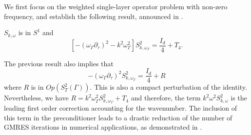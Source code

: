 \documentclass[a4paper]{article}
\begin{document}
We first focus on the weighted single-layer operator problem with non-zero frequency, and establish the following result, announced in \cite{alouges2018new}.
\begin{The}
	\label{TheSkomega}
	$S_{k,\omega}$ is in $S^1$ and
	\[\left[-(\omega_\Gamma \partial_\tau)^2 - k^2\omega_\Gamma^2\right] S_{k,\omega_\Gamma}^2 = \frac{I_d}{4} + T_4.\]
\end{The}
\begin{Rem}
	The previous result also implies that
	\[-(\omega_\Gamma \partial_\tau)^2 S_{k,\omega_\Gamma}^2 = \frac{I_d}{4} + R\]
	where $R$ is in $\textit{Op}(S^2_T(\Gamma))$. This is also a compact perturbation of the identity. Nevertheless, we have $R = k^2 \omega_\Gamma^2 S_{k,\omega_\Gamma}^2 + T_4$ and therefore, the term $k^2 \omega^2S_{k,\omega}^2$ is the leading first order correction accounting for the wavenumber. The inclusion of this term in the preconditioner leads to a drastic reduction of the number of GMRES iterations in numerical applications, as demonstrated in \cite{alouges2018new}. 
\end{Rem}
\end{document}
